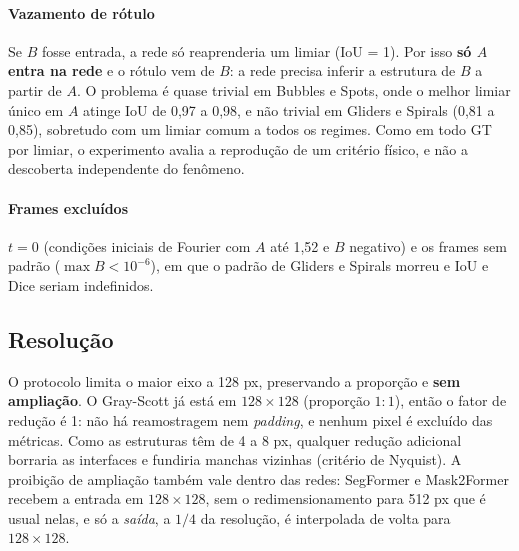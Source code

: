 \paragraph{Vazamento de rótulo} Se $B$ fosse entrada, a rede só reaprenderia um limiar (IoU = 1).
Por isso \textbf{só $A$ entra na rede} e o rótulo vem de $B$: a rede precisa inferir a estrutura
de $B$ a partir de $A$. O problema é quase trivial em Bubbles e Spots, onde o melhor limiar único
em $A$ atinge IoU de 0,97 a 0,98, e não trivial em Gliders e Spirals (0,81 a 0,85), sobretudo com
um limiar comum a todos os regimes. Como em todo GT por limiar, o experimento avalia a reprodução de
um critério físico, e não a descoberta independente do fenômeno.

\paragraph{Frames excluídos} $t=0$ (condições iniciais de Fourier com $A$ até 1,52 e $B$ negativo)
e os frames sem padrão ($\max B < 10^{-6}$), em que o padrão de Gliders e Spirals morreu e IoU e
Dice seriam indefinidos.

\subsection{Resolução}
\label{sec:resolucao}
O protocolo limita o maior eixo a 128 px, preservando a proporção e \textbf{sem ampliação}. O
Gray-Scott já está em $128\times128$ (proporção $1{:}1$), então o fator de redução é 1: não há
reamostragem nem \emph{padding}, e nenhum pixel é excluído das métricas. Como as estruturas têm de 4 a
8 px, qualquer redução adicional borraria as interfaces e fundiria manchas vizinhas (critério de
Nyquist). A proibição de ampliação também vale dentro das redes: SegFormer e Mask2Former recebem a
entrada em $128\times128$, sem o redimensionamento para 512 px que é usual nelas, e só a
\emph{saída}, a $1/4$ da resolução, é interpolada de volta para $128\times128$.

